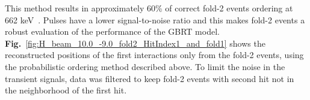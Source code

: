     
This method results in approximately 60\% of correct fold-2 events ordering at 662 keV~\cite{Piqueras2004ADetectors}.
Pulses have a lower signal-to-noise ratio and this makes fold-2 events a robust evaluation of the performance of the GBRT model. \textbf{Fig.}~\ref{fig:H_beam_10.0_-9.0_fold2_HitIndex1_and_fold1} shows the reconstructed positions of the first interactions only from the fold-2 events, using the probabilistic ordering method described above. To limit the noise in the transient signals, data was filtered to keep fold-2 events with second hit not in the neighborhood of the first hit.




